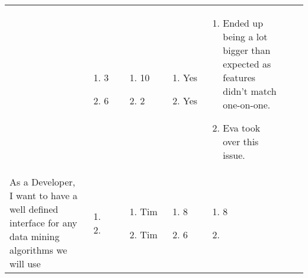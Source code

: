 \documentclass[11pt,a4paper,landscape]{article}
\begin{document}
\begin{table}[h]
\begin{tabular}{|p{5cm}|p{1.0cm}|p{2.5cm}|p{1.8cm}|p{1.8cm}|p{1.0cm}|p{12cm}}
& 
\begin{enumerate}[leftmargin=0.1cm,itemindent=0.1cm]
\item[] 3 
\item[] 6 
\end{enumerate}

& \begin{enumerate}[leftmargin=0.1cm,itemindent=0.1cm]
\item[] 10 
\item[] 2 
\end{enumerate}

& \begin{enumerate}[leftmargin=0.1cm,itemindent=0.1cm]
\item[] Yes
\item[] Yes
\end{enumerate}

& \begin{enumerate}[leftmargin=0.5cm,itemindent=0.1cm]
\item Ended up being a lot bigger than expected as features didn't match one-on-one.
\item Eva took over this issue.
\end{enumerate}

 \\

As a Developer, I want to have a well defined interface for any data mining algorithms we will use & \begin{enumerate}[leftmargin=0.3cm,itemindent=0.1cm]
\item 
\item
\end{enumerate}

& 
\begin{enumerate}[leftmargin=0.1cm,itemindent=0.1cm]
\item[] Tim
\item[] Tim
\end{enumerate}

& 
\begin{enumerate}[leftmargin=0.1cm,itemindent=0.1cm]
\item[] 8 
\item[] 6 
\end{enumerate}

&
\begin{enumerate}[leftmargin=0.1cm,itemindent=0.1cm]
\item[] 8 
\item[]
\end{enumerate}


\end{tabular}
\end{table}
\end{document}
